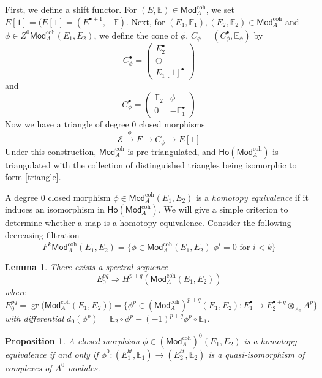 \documentclass[12pt]{amsart}
\newtheorem{lem}[thm]{Lemma}
\newtheorem{prop}[thm]{Proposition}
\theoremstyle{definition}
\theoremstyle{remark}
\numberwithin{equation}{section}
\newcommand{\1}{{\mathbb{1}}}
\newcommand{\E}{{\mathcal{E}}}
\newcommand{\EE}{{\mathbb{E}}}
\newcommand{\gr}{\operatorname{gr}}
\newcommand{\Mod}{\mathsf{Mod}}
\newcommand{\ho}{\mathsf{Ho}}
\newcommand{\bt}{\bullet}
\newcommand{\coh}{{\operatorname{coh}}}
\begin{document}
First, we define a shift functor. For $(E, \mathbb{E}) \in \Mod^{\coh}_{{A}}$, we set $E[1] = (E[1] = (E^{\bt+1}, -\EE)$. Next, for $(E_1, \EE_1), (E_2, \EE_2) \in \Mod^{\coh}_{{A}}$ and $\phi \in Z^0\Mod^{\coh}_{{A}}(E_1, E_2)$, we define the cone of $\phi$, $C_{\phi} = (C_{\phi}^{\bt}, \EE_{\phi})$ by
\begin{equation*}
    C_{\phi}^{\bt}=\begin{pmatrix}
    E_2^{\bt}\\
    \oplus\\
    E_1[1]^{\bt}
    \end{pmatrix}
\end{equation*}
and 
\begin{equation*}
    C_{\phi}^{\bt}=\begin{pmatrix}
    \EE_2& \phi\\
    0 & -\EE_1^{\bt}
    \end{pmatrix}
\end{equation*}
Now we have a triangle of degree 0 closed morphisms 
\begin{equation}\label{triangle}
    \E\stackrel{\phi}{\to} F\to C_{\phi}\to E[1]
\end{equation} Under this construction, $\Mod^{\coh}_{{A}}$ is pre-triangulated, and $\ho(\Mod^{\coh}_{{A}})$ is triangulated with the collection of distinguished triangles being isomorphic to form \ref{triangle}.



    A degree 0 closed morphism $\phi \in \Mod^{\coh}_{{A}}(E_1, E_2)$ is a {\it homotopy equivalence} if it induces an isomorphism in $\ho(\Mod^{\coh}_{{A}})$. We will give a simple criterion to determine whether a map is a homotopy equivalence. Consider the following decreasing filtration
\begin{equation*}
    F^k\Mod^{\coh}_{{A}}(E_1, E_2) = \{ \phi \in \Mod^{\coh}_{{A}}(E_1, E_2)| \phi^i = 0  \text{ for $i < k$}\}
\end{equation*}
\begin{lem}
    There exists a spectral sequence
    $$
    E^{pq}_0 \Longrightarrow H^{p+q}(\Mod^{\coh}_{{A}}(E_1, E_2))
    $$
    where
    $$
    E^{pq}_0 = \gr\big(\Mod^{\coh}_{{A}}(E_1, E_2)\big) = \{\phi^p \in (\Mod^{\coh}_{{A}})^{p+q}(E_1, E_2):E_1^{\bt} \to E_2^{\bt+q}\otimes_{A_0} A^p\}
    $$
    with differential $d_0(\phi^p) = \EE_2\circ \phi^p - (-1)^{p+q}\phi^p \circ \EE_1$.
\end{lem}

\begin{prop}
    A closed morphism $\phi \in (\Mod^{\coh}_{{A}})^0(E_1, E_2)$ is a homotopy equivalence if and only if $\phi^0: (E_1^{bt}, \EE_1) \to (E_2^{bt}, \EE_2)$ is a quasi-isomorphism of complexes of $A^0$-modules.
\end{prop}
\end{document}
